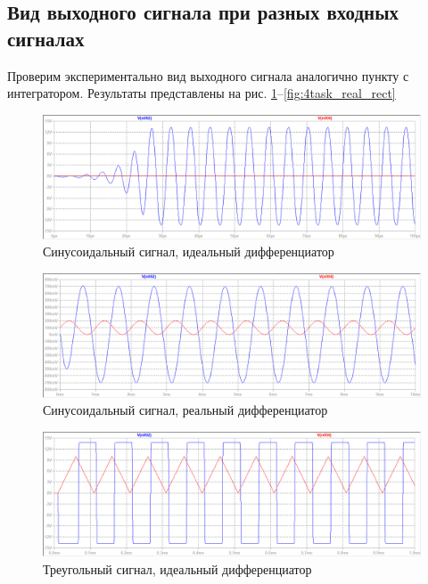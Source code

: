 \documentclass[a4paper, 12pt]{article}
\begin{document}
    \subsection{Вид выходного сигнала при разных входных сигналах}
    Проверим экспериментально вид выходного сигнала аналогично пункту с интегратором.
    Результаты представлены на рис. \ref{fig:4task_ideal_sine}--\ref{fig:4task_real_rect}
    \begin{figure}[H]
        \centering
        \includegraphics[scale=0.46]{4task_ideal_sine.png}
        \captionsetup{skip=0pt}
        \caption{Синусоидальный сигнал, идеальный дифференциатор}
        \label{fig:4task_ideal_sine}
    \end{figure}
    \begin{figure}[H]
        \centering
        \includegraphics[scale=0.46]{4task_real_sine.png}
        \captionsetup{skip=0pt}
        \caption{Синусоидальный сигнал, реальный дифференциатор}
        \label{fig:4task_real_sine}
    \end{figure}
    \begin{figure}[H]
        \centering
        \includegraphics[scale=0.46]{4task_ideal_triangle.png}
        \captionsetup{skip=0pt}
        \caption{Треугольный сигнал, идеальный дифференциатор}
        \label{fig:4task_ideal_triangle}
    \end{figure}
\end{document}
